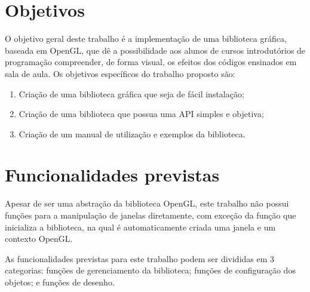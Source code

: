 \documentclass[12pt, %
openright,
oneside, %
a4paper,    %
brazil]{facom-ufu-abntex2}
\begin{document}
\section{Objetivos}
O objetivo geral deste trabalho é a implementação de uma biblioteca gráfica, baseada em OpenGL, que dê a possibilidade aos alunos de cursos introdutórios de programação compreender, de forma visual, os efeitos dos códigos ensinados em sala de aula. Os objetivos específicos do trabalho proposto são:

\begin{enumerate}
\item Criação de uma biblioteca gráfica que seja de fácil instalação;
\item Criação de uma biblioteca que possua uma API simples e objetiva;
\item Criação de um manual de utilização e exemplos da biblioteca.
\end{enumerate}

\section{Funcionalidades previstas}
Apesar de ser uma abstração da biblioteca OpenGL, este trabalho não possui funções para a manipulação de janelas diretamente, com exceção da função que inicializa a biblioteca, na qual é automaticamente criada uma janela e um contexto OpenGL.

As funcionalidades previstas para este trabalho podem ser divididas em 3 categorias: funções de gerenciamento da biblioteca; funções de configuração dos objetos; e funções de desenho.
\end{document}
